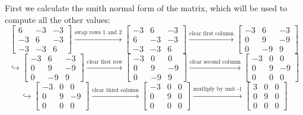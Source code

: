 \documentclass[11pt]{article}
\begin{document}
First we calculate the smith normal form of the matrix, which will be used to compute all the other values:
\begin{equation*}
  \begin{bmatrix}
    6 & -3 & -3 \\
    -3 & 6 & -3 \\
    -3 & -3 & 6
  \end{bmatrix}  
  \xrightarrow{\text{swap rows 1 and 2}}
  \begin{bmatrix}
    -3 & 6 & -3 \\
    6 & -3 & -3 \\
    -3 & -3 & 6
  \end{bmatrix}
  \xrightarrow{\text{clear first column}}
  \begin{bmatrix}
    -3 & 6 & -3 \\
    0 & 9 & -9 \\
    0 & -9 & 9
  \end{bmatrix}
\end{equation*}
\begin{equation*}
  \hookrightarrow
  \begin{bmatrix}
    -3 & 6 & -3 \\
    0 & 9 & -9 \\
    0 & -9 & 9
  \end{bmatrix}
  \xrightarrow{\text{clear first row}}
  \begin{bmatrix}
    -3 & 0 & 0 \\
    0 & 9 & -9 \\
    0 & -9 & 9
  \end{bmatrix}
  \xrightarrow{\text{clear second column}}
  \begin{bmatrix}
    -3 & 0 & 0 \\
    0 & 9 & -9 \\
    0 & 0 & 0
  \end{bmatrix}
\end{equation*}
\begin{equation*}
  \hookrightarrow
  \begin{bmatrix}
    -3 & 0 & 0 \\
    0 & 9 & -9 \\
    0 & 0 & 0
  \end{bmatrix}
  \xrightarrow{\text{clear third column}}
  \begin{bmatrix}
    -3 & 0 & 0 \\
    0 & 9 & 0 \\
    0 & 0 & 0
  \end{bmatrix}
  \xrightarrow{\text{mutliply by unit -1}}
  \begin{bmatrix}
    3 & 0 & 0 \\
    0 & 9 & 0 \\
    0 & 0 & 0
  \end{bmatrix}
\end{equation*}
\end{document}
